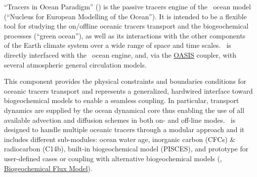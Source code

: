 
``Tracers in Ocean Paradigm'' (\TOP) is the passive tracers engine of
the \NEMO\ ocean model (``Nucleus for European Modelling of the Ocean'').
It is intended to be a flexible tool for studying the on/offline oceanic tracers transport and
the biogeochemical processes (``green ocean''),
as well as its interactions with the other components of the Earth climate system over
a wide range of space and time scales.
\TOP\ is directly interfaced with the \NEMO\ ocean engine, and,
via the \href{http://portal.enes.org/oasis}{OASIS} coupler,
with several atmospheric general circulation models.

This component provides the physical constraints and boundaries conditions for
oceanic tracers transport and represents a generalized, hardwired interface toward
biogeochemical models to enable a seamless coupling.
In particular, transport dynamics are supplied by the ocean dynamical core thus
enabling the use of all available advection and diffusion schemes in both on- and off-line modes.
\TOP\ is designed to handle multiple oceanic tracers through a modular approach and
it includes different sub-modules: ocean water age, inorganic carbon (CFCs) \& radiocarbon (C14b),
built-in biogeochemical model (PISCES), and prototype for user-defined cases or
coupling with alternative biogeochemical models (\eg, \href{http://www.bfm-community.eu}{Biogeochemical Flux Model}).
